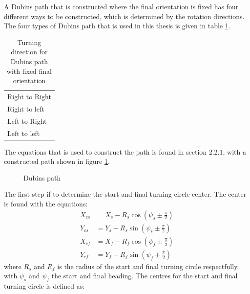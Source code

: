 A Dubins path that is constructed where the final orientation is fixed has four different ways to be constructed, which is determined by the rotation directions. The four types of Dubins path that is used in this thesis is given in table \ref{Tb:DubinsTurningDirection}.
\begin{table}[H]
\centering
\begin{adjustbox}{max width=\textwidth}
\begin{tabular}{ | l |}
\hline
Right to Right \\
Right to left \\
Left to Right \\
Left to left \\ \hline
\end{tabular}
\end{adjustbox}
\caption{Turning direction for Dubins path with fixed final orientation}
\label{Tb:DubinsTurningDirection}
\end{table}
The equations that is used to construct the path is found in \citep{tsourdos2010cooperative} section 2.2.1, with a constructed path shown in figure \ref{Fig:DubinsPath}. 
\begin{figure}[H]
\def\svgwidth{\textwidth} %

\caption{Dubins path}
\label{Fig:DubinsPath}
\end{figure}
The first step if to determine the start and final turning circle center. The center is found with the equations:
\begin{subequations}
\begin{align}
X_{cs} &= X_s - R_s\cos(\psi_s \pm \frac{\pi}{2}) \\
Y_{cs} &= Y_s - R_s\sin(\psi_s \pm \frac{\pi}{2}) \\
X_{cf} &= X_f - R_f\cos(\psi_f \pm \frac{\pi}{2}) \\
Y_{cf} &= Y_f - R_f\sin(\psi_f \pm \frac{\pi}{2})
\end{align}
\end{subequations}
where $R_s$ and $R_f$ is the radius of the start and final turning circle respectfully, with $\psi_s$ and $\psi_f$ the start and final heading. The centres for the start and final turning circle is defined as:

